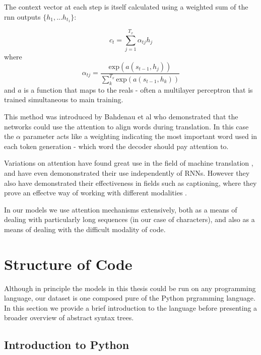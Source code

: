The context vector at each step is itself calculated using a weighted sum of the rnn outputs $\{h_1,... h_{t_1}\}$:

\begin{equation}
c_t = \sum_{j=1}^{T_x}\alpha_{tj}h_j
\end{equation}
where
\begin{equation}
\alpha_{tj} = \dfrac{\text{exp}(a(s_{t-1}, h_j))}{\sum_k^{T_x}\text{exp}(a(s_{t-1}, h_k))}
\end{equation}
and $a$ is a function that maps to the reals - often a multilayer perceptron that is trained simultaneous to main training. 





This method was introduced by Bahdenau et al \cite{bahdanau_neural_2014} who demonstrated that the networks could use the attention to align words during translation.
In this case the $\alpha$ parameter acts like a weighting indicating the most important word used in each token generation - which word the decoder should pay attention to.

Variations on attention have found great use in the field of machine translation  \cite{luong_effective_2015}, and have even demononstrated their use independently of RNNs\cite{vaswani_attention_2017}. However they also have demonstrated their effectiveness in fields such as captioning, where they prove an effectve way of working with different modalities \cite{xu_show_2015}.

In our models we use attention mechanisms extensively, both as a means of dealing with particularly long sequences (in our case of characters), and also as a means of dealing with the difficult modality of code.




\section{Structure of Code} %
\label{sec:translating_code}

Although in principle the models in this thesis could be run on any programming language, our dataset is one composed pure of the Python prgramming language.  
In this section we provide a brief introduction to the language before presenting a broader overview of abstract syntax trees.

\subsection{Introduction to Python} %
\label{sub:python}


